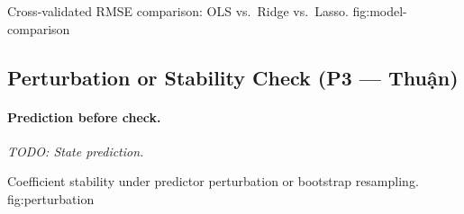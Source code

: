 %
    {Cross-validated RMSE comparison: OLS vs.\ Ridge vs.\ Lasso.}%
    {fig:model-comparison}

\bigskip
\noindent
{}

\subsection{Perturbation or Stability Check (P3 — Thuận)}
\label{sec:perturbation}

\paragraph{Prediction before check.}
\textit{TODO: State prediction.}

%
    {Coefficient stability under predictor perturbation or bootstrap resampling.}%
    {fig:perturbation}

